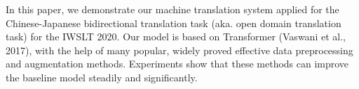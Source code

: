 In this paper, we demonstrate our machine translation system applied for the Chinese-Japanese bidirectional translation task (aka. open domain translation task) for the IWSLT 2020. Our model is based on Transformer (Vaswani et al., 2017), with the help of many popular, widely proved effective data preprocessing and augmentation methods. Experiments show that these methods can improve the baseline model steadily and significantly.
